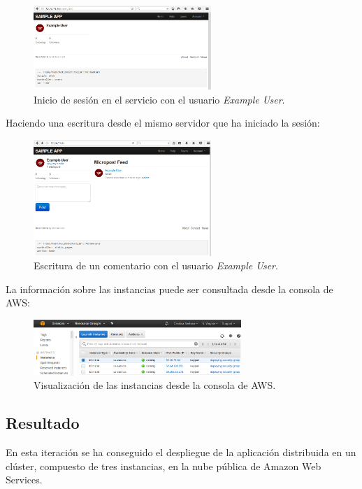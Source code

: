 \begin{figure}[H]
\centering
\includegraphics[width=0.6\textwidth]{images/figures/login-confd.png}
\caption{Inicio de sesión en el servicio con el usuario \textit{Example User}.}
\end{figure}

Haciendo una escritura desde el mismo servidor que ha iniciado la sesión:

\begin{figure}[H]
\centering
\includegraphics[width=0.6\textwidth]{images/figures/post-confd.png}
\caption{Escritura de un comentario con el usuario \textit{Example User}.}
\end{figure}

La información sobre las instancias puede ser consultada desde la consola de AWS:

\begin{figure}[H]
\centering
\includegraphics[width=0.7\textwidth]{images/figures/aws-confd.png}
\caption{Visualización de las instancias desde la consola de AWS.}
\end{figure}

\subsection{Resultado}

En esta iteración se ha conseguido el despliegue de la aplicación distribuida en un clúster, compuesto de tres instancias, en la nube pública de Amazon Web Services.

